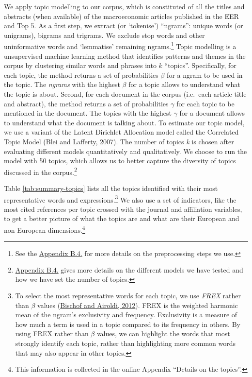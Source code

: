\documentclass[
  12pt,
  onecolumn]{article}
\begin{document}
We apply topic modelling to our corpus, which is constituted of all the
titles and abstracts (when available) of the macroeconomic articles
published in the EER and Top 5. As a first step, we extract (or
`tokenise') ``ngrams'': unique words (or unigrams), bigrams and
trigrams. We exclude stop words and other uninformative words and
`lemmatise' remaining ngrams.\footnote{See the
  \protect\hyperlink{topic}{Appendix B.4.} for more details on the
  preprocessing steps we use.} Topic modelling is a unsupervised machine
learning method that identifies patterns and themes in the corpus by
clustering similar words and phrases into \(k\) ``topics''.
Specifically, for each topic, the method returns a set of probabilities
\(\beta\) for a ngram to be used in the topic. The \emph{ngrams} with
the highest \(\beta\) for a topic allows to understand what the topic is
about. Second, for each document in the corpus (i.e.~each article title
and abstract), the method returns a set of probabilities \(\gamma\) for
each topic to be mentioned in the document. The topics with the highest
\(\gamma\) for a document allows to understand what the document is
talking about. To estimate our topic model, we use a variant of the
Latent Dirichlet Allocation model called the Correlated Topic Model
(\protect\hyperlink{ref-blei2007}{Blei and Lafferty, 2007}). The number
of topics \emph{k} is chosen after evaluating different models
quantitatively and qualitatively. We choose to run the model with 50
topics, which allows us to better capture the diversity of topics
discussed in the corpus.\footnote{\protect\hyperlink{topic}{Appendix
  B.4.} gives more details on the different models we have tested and
  how we have set the number of topics.}

Table \ref{tab:summary-topics} lists all the topics identified with
their most representative words and expressions.\footnote{To select the
  most representative words for each topic, we use \emph{FREX} rather
  than \(\beta\) values (\protect\hyperlink{ref-bischof2012}{Bischof and
  Airoldi, 2012}). FREX is the weighted harmonic mean of the ngram's
  exclusivity and frequency. Exclusivity is a measure of how much a term
  is used in a topic compared to its frequency in others. By using FREX
  rather than \(\beta\) values, we can highlight the words that most
  strongly identify each topic, rather than highlighting more common
  words that may also appear in other topics.} We also use a set of
indicators, like the most cited references per topic crossed with the
journal and affiliation variables, to get a better picture of what the
topics are and what are their European and non-European
dimensions.\footnote{This information is collected in the online
  Appendix ``Details on the topics''.}
\end{document}
